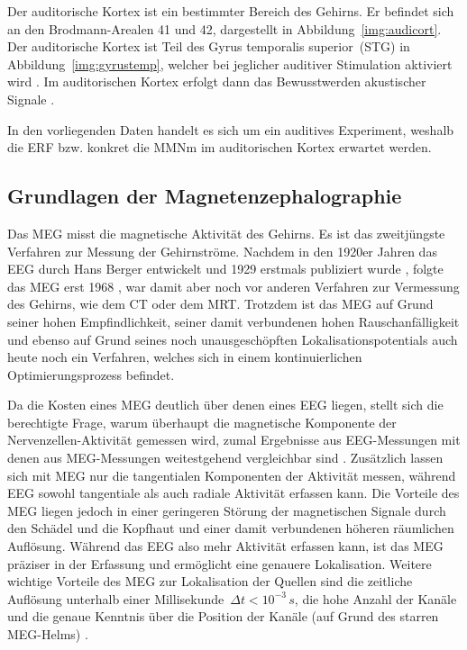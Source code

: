 \documentclass[doc,a4paper,12pt]{apa6}
\begin{document}
Der auditorische Kortex ist ein bestimmter Bereich des Gehirns. Er befindet sich an den Brodmann-Arealen 41 und 42, dargestellt in Abbildung~\ref{img:audicort}. Der auditorische Kortex ist Teil des Gyrus temporalis superior~(STG) in Abbildung~\ref{img:gyrustemp}, welcher bei jeglicher auditiver Stimulation aktiviert wird \parencite{binder1994functional}. Im auditorischen Kortex erfolgt dann das Bewusstwerden akustischer Signale \parencite{jaaskelainen2004human}.

In den vorliegenden Daten handelt es sich um ein auditives Experiment, weshalb die ERF bzw. konkret die MMNm im auditorischen Kortex erwartet werden.


\subsection{Grundlagen der Magnetenzephalographie}

Das MEG misst die magnetische Aktivität des Gehirns. Es ist das zweitjüngste Verfahren zur Messung der Gehirnströme. Nachdem in den 1920er Jahren das EEG durch Hans Berger entwickelt und 1929 erstmals publiziert wurde \parencite{berger1929elektrenkephalogramm}, folgte das MEG erst 1968 \parencite{cohen1968magnetoencephalography}, war damit aber noch vor anderen Verfahren zur Vermessung des Gehirns, wie dem CT oder dem MRT. Trotzdem ist das MEG auf Grund seiner hohen Empfindlichkeit, seiner damit verbundenen hohen Rauschanfälligkeit und ebenso auf Grund seines noch unausgeschöpften Lokalisationspotentials auch heute noch ein Verfahren, welches sich in einem kontinuierlichen Optimierungsprozess befindet.

Da die Kosten eines MEG deutlich über denen eines EEG liegen, stellt sich die berechtigte Frage, warum überhaupt die magnetische Komponente der Nervenzellen-Aktivität gemessen wird, zumal Ergebnisse aus EEG-Messungen mit denen aus MEG-Messungen weitestgehend vergleichbar sind \parencite{huotilainen1998combined}. Zusätzlich lassen sich mit MEG nur die tangentialen Komponenten der Aktivität messen, während EEG sowohl tangentiale als auch radiale Aktivität erfassen kann. Die Vorteile des MEG liegen jedoch in einer geringeren Störung der magnetischen Signale durch den Schädel und die Kopfhaut und einer damit verbundenen höheren räumlichen Auflösung. Während das EEG also mehr Aktivität erfassen kann, ist das MEG präziser in der Erfassung und ermöglicht eine genauere Lokalisation. Weitere wichtige Vorteile des MEG zur Lokalisation der Quellen sind die zeitliche Auflösung unterhalb einer Millisekunde~$\Delta t < 10^{-3}\,s$, die hohe Anzahl der Kanäle und die genaue Kenntnis über die Position der Kanäle (auf Grund des starren MEG-Helms) \parencite{malmivuo2012comparison}.
\end{document}
